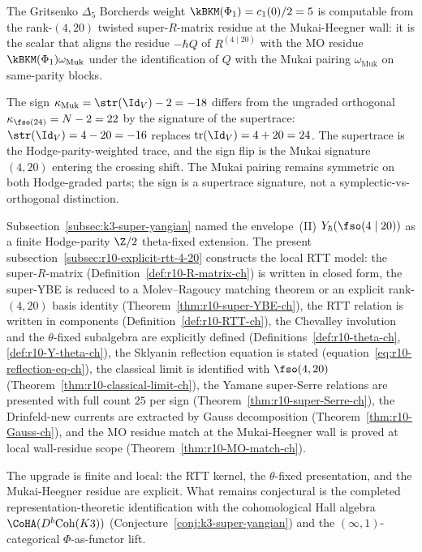 \begin{corollary}[$\kBKM(\Phi_1) = 5$ via twisted-Yangian residue]
\label{cor:r10-kappa-BKM-via-twisted-ch}
The Gritsenko $\Delta_5$ Borcherds weight
$\kBKM(\Phi_1) = c_1(0)/2 = 5$ is computable from the rank-$(4, 20)$
twisted super-$R$-matrix residue at the Mukai-Heegner wall: it is
the scalar that aligns the residue $-\hbar Q$ of
$R^{(4 \mid 20)}$ with the MO residue
$\kBKM(\Phi_1) \omega_{\mathrm{Muk}}$ under the identification of
$Q$ with the Mukai pairing $\omega_{\mathrm{Muk}}$ on same-parity
blocks.
\end{corollary}

\begin{remark}
\label{rem:r10-crossing-sign-ch}
The sign $\kappa_{\mathrm{Muk}} = \str(\Id_V) - 2 = -18$ differs
from the ungraded orthogonal $\kappa_{\fso(24)} = N - 2 = 22$ by
the signature of the supertrace: $\str(\Id_V) = 4 - 20 = -16$
replaces $\mathrm{tr}(\Id_V) = 4 + 20 = 24$. The supertrace is the
Hodge-parity-weighted trace, and the sign flip is the Mukai
signature $(4, 20)$ entering the crossing shift. The Mukai pairing
remains symmetric on both Hodge-graded parts; the
sign is a supertrace signature, not a symplectic-vs-orthogonal
distinction.
\end{remark}

\begin{remark}
\label{rem:r10-summary-ch}
Subsection~\ref{subsec:k3-super-yangian} named the envelope~(II)
$Y_\hbar(\fso(4 \mid 20))$ as a finite Hodge-parity
$\Z/2$ theta-fixed extension.
The present subsection~\ref{subsec:r10-explicit-rtt-4-20} constructs
the local RTT model: the super-$R$-matrix
(Definition~\ref{def:r10-R-matrix-ch}) is written in closed form,
the super-YBE is reduced to a Molev--Ragoucy matching theorem or an
explicit rank-$(4,20)$ basis identity
(Theorem~\ref{thm:r10-super-YBE-ch}), the
RTT relation is written in components
(Definition~\ref{def:r10-RTT-ch}), the Chevalley involution and the
$\theta$-fixed subalgebra are explicitly defined
(Definitions~\ref{def:r10-theta-ch}, \ref{def:r10-Y-theta-ch}), the
Sklyanin reflection equation is stated
(equation~\eqref{eq:r10-reflection-eq-ch}), the classical limit is
identified with $\fso(4, 20)$ (Theorem~\ref{thm:r10-classical-limit-ch}),
the Yamane super-Serre relations are presented with full count $25$
per sign (Theorem~\ref{thm:r10-super-Serre-ch}), the Drinfeld-new
currents are extracted by Gauss decomposition
(Theorem~\ref{thm:r10-Gauss-ch}), and the MO residue match at the
Mukai-Heegner wall is proved at local wall-residue scope
(Theorem~\ref{thm:r10-MO-match-ch}).

The upgrade is finite and local: the RTT kernel, the $\theta$-fixed
presentation, and the Mukai-Heegner residue are explicit. What remains
conjectural is the completed
representation-theoretic identification with the cohomological Hall
algebra $\CoHA(D^b\mathrm{Coh}(K3))$
(Conjecture~\ref{conj:k3-super-yangian}) and the
$(\infty, 1)$-categorical $\Phi$-as-functor lift.
\end{remark}


